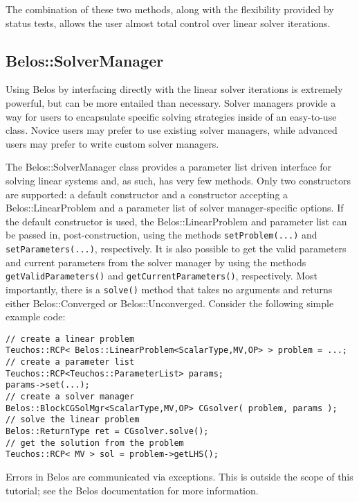 The combination of these two methods, along with the flexibility provided by status tests,
allows the user almost total control over linear solver iterations.


\subsection{Belos::SolverManager}
\label{sec:belos:solvermanager}

Using Belos by interfacing directly with the linear solver iterations is extremely powerful, 
but can be more entailed than necessary. Solver managers provide a way for users to encapsulate 
specific solving strategies inside of an easy-to-use class. Novice users may prefer to use 
existing solver managers, while advanced users may prefer to write custom solver managers.

The Belos::SolverManager class provides a parameter list driven interface for solving linear
systems and, as such, has very few methods.  Only two constructors are supported: a default constructor
and a constructor accepting a Belos::LinearProblem and a parameter list of solver manager-specific 
options.  If the default constructor is used, the Belos::LinearProblem and parameter list can be passed 
in, post-construction, using the methods \verb!setProblem(...)! and \verb!setParameters(...)!, 
respectively.  It is also possible to get the valid parameters and current parameters from the 
solver manager by using the methods \verb!getValidParameters()! and \verb!getCurrentParameters()!, 
respectively.  Most importantly, there is a \verb!solve()! method that takes no arguments and 
returns either Belos::Converged or Belos::Unconverged.
Consider the following simple example code:
\begin{verbatim}
// create a linear problem
Teuchos::RCP< Belos::LinearProblem<ScalarType,MV,OP> > problem = ...;
// create a parameter list
Teuchos::RCP<Teuchos::ParameterList> params;
params->set(...);
// create a solver manager
Belos::BlockCGSolMgr<ScalarType,MV,OP> CGsolver( problem, params );
// solve the linear problem
Belos::ReturnType ret = CGsolver.solve();
// get the solution from the problem
Teuchos::RCP< MV > sol = problem->getLHS();
\end{verbatim}

\begin{remark}
  Errors in Belos are communicated via exceptions. This is outside the scope of this
  tutorial; see the Belos documentation for more information.
\end{remark}


